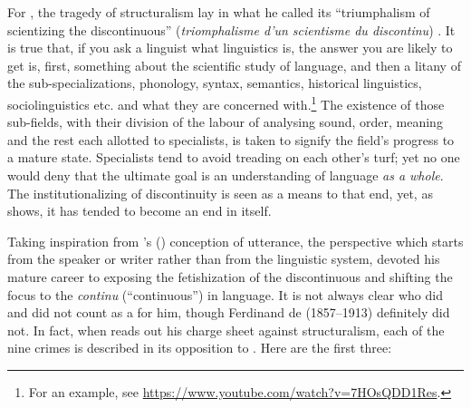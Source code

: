\documentclass[output=paper]{langscibook}
\begin{document}
\largerpage[-1]For {\Meschonnic}, the tragedy of structuralism lay in what he called its ``triumphalism of scientizing the discontinuous'' (\emph{triomphalisme d’un scientisme du discontinu}) \citep[20]{Meschonnic2009}. It is true that, if you ask a linguist what linguistics is, the answer you are likely to get is, first, something about the scientific study of language, and then a litany of the sub-specializations, phonology, syntax, semantics, historical linguistics, sociolinguistics etc. and what they are concerned with.\footnote{For an example, see \url{https://www.youtube.com/watch?v=7HOsQDD1Res}.} The existence of those sub-fields, with their division of the labour of analysing sound, order, meaning and the rest each allotted to specialists, is taken to signify the field's progress to a mature state. Specialists tend to avoid treading on each other's turf; yet no one would deny that the ultimate goal is an understanding of language \emph{as a whole}. The institutionalizing of discontinuity is seen as a means to that end, yet, as {\Meschonnic} shows, it has tended to become an end in itself.

Taking inspiration from {\Benveniste}'s (\citeyear{Benveniste1970appareil}) conception of utterance, the perspective which starts from the speaker or writer rather than from the linguistic system, {\Meschonnic} devoted his mature career to exposing the  fetishization of the discontinuous and shifting the focus to the \emph{continu} (``continuous'') in language. It is not always clear who did and did not count as a  for him, though Ferdinand de {\Saussure} (1857--1913) definitely did not. In fact, when {\Meschonnic} reads out his charge sheet against structuralism, each of the nine crimes is described in its opposition to {\Saussure}. Here are the first three:
\end{document}
